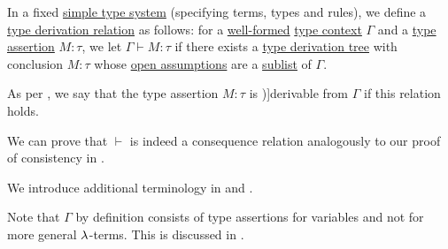 \begin{definition}\label{def:simple_type_derivability}\mimprovised
  In a fixed \hyperref[def:simple_type_system]{simple type system} (specifying terms, types and rules), we define a \hyperref[def:type_derivation_relation]{type derivation relation} as follows: for a \hyperref[rem:well_formed_context]{well-formed} \hyperref[def:type_context]{type context} \( \Gamma \) and a \hyperref[def:type_assertion]{type assertion} \( M: \tau \), we let \( \Gamma \vdash M: \tau \) if there exists a \hyperref[def:type_derivation_tree]{type derivation tree} with conclusion \( M: \tau \) whose \hyperref[def:type_derivation_tree/open]{open assumptions} are a \hyperref[def:subsequence]{sublist} of \( \Gamma \).

  As per , we say that the type assertion \( M: \tau \) is \term[en=derivable (\cite[def. 3.1.4]{Barendregt1992LambdaCalculiWithTypes})]{derivable} from \( \Gamma \) if this relation holds.
\end{definition}
\begin{defproof}
  We can prove that \( {\vdash} \) is indeed a consequence relation analogously to our proof of consistency in .
\end{defproof}
\begin{comments}
  \item We introduce additional terminology in  and .

  \item Note that \( \Gamma \) by definition consists of type assertions for variables and not for more general \( {\mathrm \lambda} \)-terms. This is discussed in .
\end{comments}

